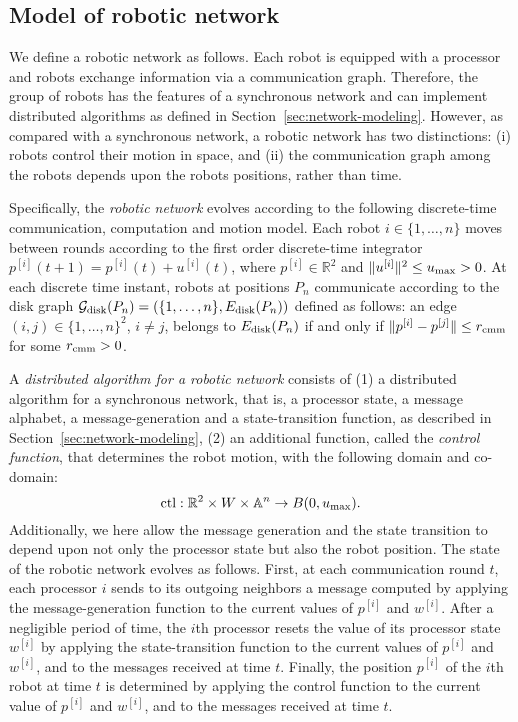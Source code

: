 \documentclass[onecolumn,journal,letterpaper]{IEEEtran}
\newcommand{\real}{{\mathbb{R}}}
\newcommand{\subscr}[2]{{#1}_{\textup{#2}}}
\newcommand{\map}[3]{#1: #2 \rightarrow #3}
\newcommand{\norm}[1]{\|#1\|}
\newcommand{\alphabet}{\mathbb{A}}
\newcommand{\umax}{\subscr{r}{ctr}}
\renewcommand{\umax}{\subscr{u}{max}}
\newcommand{\rcmm}{\subscr{r}{cmm}}
\newcommand{\GG}{\mathcal{G}}
\newcommand{\cball}[2]{B(#2,#1)}
\newcommand{\until}[1]{\{1,\dots,#1\}}
\newcommand{\supind}[2]{{#1}^{[#2]}}
\newcommand{\ctrl}{\textup{ctl}}
\begin{document}
\subsection{Model of robotic network}
We define a robotic network as follows. Each robot is equipped with a
processor and robots exchange information via a communication graph.
Therefore, the group of robots has the features of a synchronous network
and can implement distributed algorithms as defined in
Section~\ref{sec:network-modeling}. However, as compared with a synchronous
network, a robotic network has two distinctions: (i) robots control their
motion in space, and (ii) the communication graph among the robots depends
upon the robots positions, rather than time.

Specifically, the \emph{robotic network} evolves according to the following
discrete-time communication, computation and motion model. Each robot
$i\in\until{n}$ moves between rounds according to the first order
discrete-time integrator $\supind{p}{i}(t+1) = \supind{p}{i}(t) +
\supind{u}{i}(t)$, where $\supind{p}{i}\in\real^2$ and
$\|\supind{u}{i}\|^2\leq \umax>0$.  At each discrete time instant, robots
at positions $P_n$ communicate according to the disk graph
$\subscr{\GG}{disk}(P_n) = (\until{n}, \subscr{E}{disk}(P_n))$ defined as
follows: an edge $(i,j)\in\until{n}^2$, $i\ne{j}$, belongs to
$\subscr{E}{disk}(P_n)$ if and only if
$\norm{\supind{p}{i}-\supind{p}{j}}{}\leq \rcmm$ for some $\rcmm>0$.

A \emph{distributed algorithm for a robotic network} consists of (1) a
distributed algorithm for a synchronous network, that is, a processor
state, a message alphabet, a message-generation and a state-transition
function, as described in Section~\ref{sec:network-modeling}, (2) an
additional function, called the \emph{control function}, that determines
the robot motion, with the following domain and co-domain:
\begin{equation*}
  \map{\ctrl} {\real^2  \times W \times \alphabet^n} {\cball{\umax}{0} }.
\end{equation*}
Additionally, we here allow the message generation and the state transition
to depend upon not only the processor state but also the robot position.
The state of the robotic network evolves as follows. First, at each
communication round $t$, each processor $i$ sends to its outgoing neighbors
a message computed by applying the message-generation function to the
current values of $\supind{p}{i}$ and $\supind{w}{i}$.  After a negligible
period of time, the $i$th processor resets the value of its processor state
$\supind{w}{i}$ by applying the state-transition function to the current
values of $\supind{p}{i}$ and $\supind{w}{i}$, and to the messages received
at time $t$. Finally, the position $\supind{p}{i}$ of the $i$th robot at
time $t$ is determined by applying the control function to the current
value of $\supind{p}{i}$ and $\supind{w}{i}$, and to the messages received
at time $t$.
\end{document}
